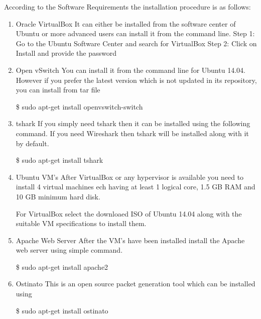 \documentclass[12pt,a4paper,final]{report}
\begin{document}
According to the Software Requirements the installation procedure is as follows:
\begin{enumerate}
\item
Oracle VirtualBox
\newline
It can either be installed from the software center of Ubuntu or more advanced users can install it from the command line.
\newline
Step 1: Go to the Ubuntu Software Center and search for VirtualBox
\newline
Step 2: Click on Install and provide the password

\item
Open vSwitch
\newline
You can install it from the command line for Ubuntu 14.04. However if you prefer the latest version which is not updated in its repository, you can install from tar file
\begin{center}
\$ sudo apt-get install openvswitch-switch
\end{center}

\item
tshark
\newline
If you simply need tshark then it can be installed using the following command. If you need Wireshark then tshark will be installed along with it by default.
\begin{center}
\$ sudo apt-get install tshark
\end{center}

\item
Ubuntu VM's
\newline
After VirtualBox or any hypervisor is available you need to install 4 virtual machines ech having at least 1 logical core, 1.5 GB RAM and 10 GB minimum hard disk. 

For VirtualBox select the downloaed ISO of Ubuntu 14.04 along with the suitable VM specifications to install them.

\item
Apache Web Server
\newline
After the VM's have been installed install the Apache web server using simple command.
\begin{center}
\$ sudo apt-get install apache2
\end{center}

\item
Ostinato
\newline
This is an open source packet generation tool which can be installed using
\begin{center}
\$ sudo apt-get install ostinato
\end{center}


\end{enumerate}
\end{document}
